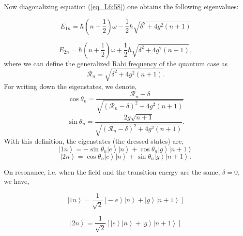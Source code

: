 \documentclass[12pt]{iopart}
\begin{document}
\noindent Now diagonalizing equation (\ref{eq_L6:58}) one obtains the following eigenvalues:

\begin{equation}
E_{1n}=\hbar\left(n+\frac{1}{2}\right)\omega-\frac{1}{2}\hbar\sqrt{\delta^{2}+4g^{2}\left(n+1\right)}\label{eq:60}\end{equation}

\begin{equation}
E_{2n}=\hbar\left(n+\frac{1}{2}\right)\omega+\frac{1}{2}\hbar\sqrt{\delta^{2}+4g^{2}\left(n+1\right)},\label{eq:61}\end{equation}
where we can define the generalized Rabi frequency of the quantum case as
\begin{equation}
\mathcal{R}_{n}=\sqrt{\delta^{2}+4g^{2}\left(n+1\right)}.\label{eq:62}\end{equation}
For writing down the eigenstates, we denote,
\begin{equation}
\cos\theta_{n}=\frac{\mathcal{R}_{n}-\delta}{\sqrt{\left(\mathcal{R}_{n}-\delta\right)^{2}+4g^{2}\left(n+1\right)}}\label{eq:63}\end{equation}
\begin{equation}
\sin\theta_{n}=\frac{2g\sqrt{n+1}}{\sqrt{\left(\mathcal{R}_{n}-\delta\right)^{2}+4g^{2}\left(n+1\right)}}.\label{eq:64}\end{equation}
With this definition, the eigenstates (the dressed states) are,
\begin{equation}
\left|1n\right\rangle =-\sin\theta_{n}\left|e\right\rangle \left|n\right\rangle +\cos\theta_{n}\left|g\right\rangle \left|n+1\right\rangle \label{eq_L6:65}\end{equation}
\begin{equation}
\left|2n\right\rangle =\cos\theta_{n}\left|e\right\rangle \left|n\right\rangle +\sin\theta_{n}\left|g\right\rangle \left|n+1\right\rangle .\label{eq_L6:66}\end{equation}

\noindent On resonance, i.e. when the field and the transition energy are the same, $\delta=0$, we have,

\begin{equation}
\left|1n\right\rangle =\frac{1}{\sqrt{2}}\left[-\left|e\right\rangle \left|n\right\rangle +\left|g\right\rangle \left|n+1\right\rangle \right]\label{eq:68}\end{equation}


\begin{equation}
\left|2n\right\rangle =\frac{1}{\sqrt{2}}\left[\left|e\right\rangle \left|n\right\rangle +\left|g\right\rangle \left|n+1\right\rangle \right]\label{eq:69}\end{equation}
\end{document}
